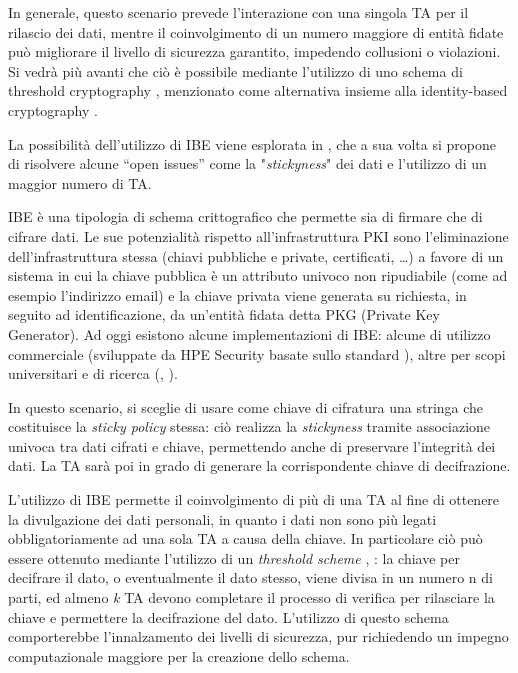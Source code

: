 In generale, questo scenario prevede l’interazione con una singola TA per il rilascio dei dati, mentre il coinvolgimento di un numero maggiore di entit\`a fidate può migliorare il livello di sicurezza garantito, impedendo collusioni o violazioni. Si vedr\`a pi\`u avanti che ci\`o \`e possibile mediante l’utilizzo di uno schema di threshold cryptography \cite{shamir1979share}, menzionato come alternativa insieme alla identity-based cryptography \cite{shamir1984identity}.

La possibilit\`a dell’utilizzo di IBE viene esplorata in \cite{mont2003towards}, che a sua volta si propone di risolvere alcune “open issues” come la "\textit{stickyness}" dei dati e l’utilizzo di un maggior numero di TA.

IBE \cite{shamir1984identity} \`e una tipologia di schema crittografico che permette sia di firmare che di cifrare dati. Le sue potenzialit\`a rispetto all’infrastruttura PKI sono l’eliminazione dell’infrastruttura stessa (chiavi pubbliche e private, certificati, …) a favore di un sistema in cui la chiave pubblica \`e un attributo univoco non ripudiabile (come ad esempio l’indirizzo email) e la chiave privata viene generata su richiesta, in seguito ad identificazione, da un’entit\`a fidata detta PKG (Private Key Generator).
Ad oggi esistono alcune implementazioni di IBE: alcune di utilizzo commerciale (sviluppate da HPE Security \cite{IBEimplVoltage} basate sullo standard \cite{boyen2007identity}), altre per scopi universitari e di ricerca (\cite{Lynn2013}, \cite{ducas2016}).

In questo scenario, si sceglie di usare come chiave di cifratura una stringa che costituisce la \textit{sticky policy} stessa: ci\`o realizza la \textit{stickyness} tramite associazione univoca tra dati cifrati e chiave, permettendo anche di preservare l’integrit\`a dei dati. La TA sar\`a poi in grado di generare la corrispondente chiave di decifrazione.

L’utilizzo di IBE permette il coinvolgimento di pi\`u di una TA al fine di ottenere la divulgazione dei dati personali, in quanto i dati non sono pi\`u legati obbligatoriamente ad una sola TA a causa della chiave. In particolare ci\`o può essere ottenuto mediante l’utilizzo di un \textit{threshold scheme} \cite{shamir1979share}, \cite{sahai2005fuzzy}: la chiave per decifrare il dato, o eventualmente il dato stesso, viene divisa in un numero n di parti, ed almeno \textit{k} TA devono completare il processo di verifica per rilasciare la chiave e permettere la decifrazione del dato. L’utilizzo di questo schema comporterebbe l’innalzamento dei livelli di sicurezza, pur richiedendo un impegno computazionale maggiore per la creazione dello schema.

